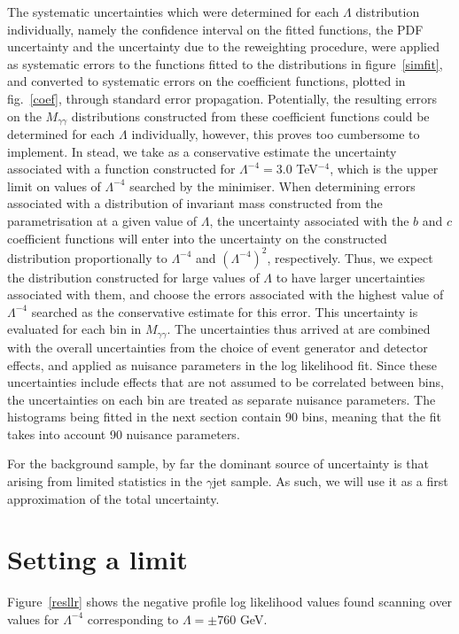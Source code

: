 The systematic uncertainties which were determined for each $\Lambda$ distribution individually, namely the confidence interval on the fitted functions, the PDF uncertainty and the uncertainty due to the reweighting procedure, were applied as systematic errors to the functions fitted to the distributions in figure~\ref{simfit}, and converted to systematic errors on the coefficient functions, plotted in fig.~\ref{coef}, through standard error propagation. Potentially, the resulting errors on the $M_{\gamma\gamma}$ distributions constructed from these coefficient functions could be determined for each $\Lambda$ individually, however, this proves too cumbersome to implement. In stead, we take as a conservative estimate the uncertainty associated with a function constructed for $\Lambda^{-4}=3.0$ TeV$^{-4}$, which is the upper limit on values of $\Lambda^{-4}$ searched by the minimiser. When determining errors associated with a distribution of invariant mass constructed from the parametrisation at a given value of $\Lambda$, the uncertainty associated with the $b$ and $c$ coefficient functions will enter into the uncertainty on the constructed distribution proportionally to $\Lambda^{-4}$ and $(\Lambda^{-4})^2$, respectively. Thus, we expect the distribution constructed for large values of $\Lambda$ to have larger uncertainties associated with them, and choose the errors associated with the highest value of $\Lambda^{-4}$ searched as the conservative estimate for this error. This uncertainty is evaluated for each bin in $M_{\gamma\gamma}$. The uncertainties thus arrived at are combined with the overall uncertainties from the choice of event generator and detector effects, and applied as nuisance parameters in the log likelihood fit. Since these uncertainties include effects that are not assumed to be correlated between bins, the uncertainties on each bin are treated as separate nuisance parameters. The histograms being fitted in the next section contain 90 bins, meaning that the fit takes into account 90 nuisance parameters.

For the background sample, by far the dominant source of uncertainty is that arising from limited statistics in the $\gamma$jet sample. As such, we will use it as a first approximation of the total uncertainty.

\section{Setting a limit}
Figure~\ref{resllr} shows the negative profile log likelihood values found scanning over values for $\Lambda^{-4}$ corresponding to $\Lambda=\pm760$ GeV.

